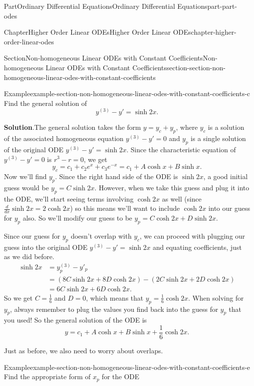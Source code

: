 \documentclass[twoside,10pt,]{book}
\newcommand{\blocktitlefont}{\relax}
\numberwithin{equation}{part}
\newcommand{\parens}[1]{\left( #1 \right)}
\newcommand{\amp}{&}
\begin{document}
\begin{partptx}{Part}{Ordinary Differential Equations}{}{Ordinary Differential Equations}{}{}{part-part-odes}
\begin{chapterptx}{Chapter}{Higher Order Linear ODEs}{}{Higher Order Linear ODEs}{}{}{chapter-higher-order-linear-odes}
\begin{sectionptx}{Section}{Non-homogeneous Linear ODEs with Constant Coefficients}{}{Non-homogeneous Linear ODEs with Constant Coefficients}{}{}{section-section-non-homogeneous-linear-odes-with-constant-coefficients}
\begin{example}{Example}{}{example-section-non-homogeneous-linear-odes-with-constant-coefficients-c}
Find the general solution of%
\begin{equation*}
y^{(3)}-y' = \sinh 2x.
\end{equation*}
%
\par\smallskip%
\noindent\textbf{\blocktitlefont Solution}.\hypertarget{solution-section-non-homogeneous-linear-odes-with-constant-coefficients-c-b}{}\quad{}The general solution takes the form \(y = y_{c}+y_{p}\), where \(y_{c}\) is a solution of the associated homogeneous equation \(y^{(3)}-y'=0\) and \(y_{p}\) is a single solution of the original ODE \(y^{(3)}-y'=\sinh 2x\). Since the characteristic equation of \(y^{(3)}-y'=0\) is \(r^{3}-r=0\), we get%
\begin{equation*}
y_{c} = c_{1}+c_{2}e^{x}+c_{3}e^{-x} = c_{1}+A\cosh x+B\sinh x.
\end{equation*}
Now we'll find \(y_{p}\). Since the right hand side of the ODE is \(\sinh 2x\), a good initial guess would be \(y_{p} = C\sinh 2x\). However, when we take this guess and plug it into the ODE, we'll start seeing terms involving \(\cosh 2x\) as well (since \(\frac{d}{dx}\sinh 2x = 2\cosh 2x\)) so this means we'll want to include \(\cosh 2x\) into our guess for \(y_{p}\) also. So we'll modify our guess to be \(y_{p} = C\cosh 2x+D\sinh 2x\).%
\par
Since our guess for \(y_{p}\) doesn't overlap with \(y_{c}\), we can proceed with plugging our guess into the original ODE \(y^{(3)}-y'=\sinh 2x\) and equating coefficients, just as we did before.%
\begin{align*}
\sinh 2x \amp= y^{(3)}_{p}-y'_{p}\\
\amp= \parens{8C\sinh2x+8D\cosh2x}-\parens{2C\sinh2x+2D\cosh2x}\\
\amp= 6C\sinh2x+6D\cosh2x.
\end{align*}
So we get \(C = \frac{1}{6}\) and \(D=0\), which means that \(y_{p} = \frac{1}{6}\cosh2x\). When solving for \(y_{p}\), always remember to plug the values you find back into the guess for \(y_{p}\) that you used! So the general solution of the ODE is%
\begin{equation*}
y = c_{1}+A\cosh x+B\sinh x+\frac{1}{6}\cosh2x.
\end{equation*}
%
\end{example}
Just as before, we also need to worry about overlaps.%
\begin{example}{Example}{}{example-section-non-homogeneous-linear-odes-with-constant-coefficients-e}%
Find the appropriate form of \(x_{p}\) for the ODE%
\begin{equation*}

\end{equation*}
\end{example}
\end{sectionptx}
\end{chapterptx}
\end{partptx}
\end{document}
